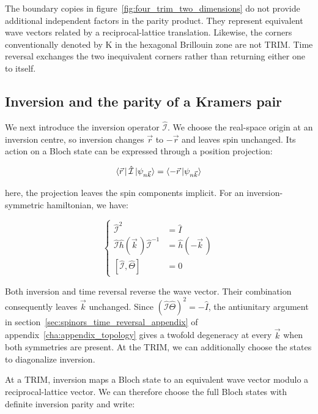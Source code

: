 The boundary copies in figure~\ref{fig:four_trim_two_dimensions} do not provide additional independent factors in the parity product.
They represent equivalent wave vectors related by a reciprocal-lattice translation.
Likewise, the corners conventionally denoted by $\mathrm{K}$ in the hexagonal Brillouin zone are not TRIM.
Time reversal exchanges the two inequivalent corners rather than returning either one to itself.

\FloatBarrier
\subsection{Inversion and the parity of a Kramers pair}

We next introduce the inversion operator $\hat{\mathcal{I}}$.
We choose the real-space origin at an inversion centre,
so inversion changes $\vec{r}$ to $-\vec{r}$ and leaves spin unchanged.
Its action on a Bloch state can be expressed through a position projection:

\begin{equation}
    \bra{\vec{r}\,}\hat{\mathcal{I}}\ket{\psi_{n\vec{k}}}
    =\braket{-\vec{r}\,|\psi_{n\vec{k}}}
\label{inversion_position_projection_topology}
\end{equation}

here, the projection leaves the spin components implicit.
For an inversion-symmetric hamiltonian, we have:

\begin{equation}
\left\{\begin{aligned}
    \hat{\mathcal{I}}^2&=\hat{I} \\
    \hat{\mathcal{I}}\hat{h}(\vec{k}\,)\hat{\mathcal{I}}^{-1}
    &=\hat{h}(-\vec{k}\,) \\
    [\hat{\mathcal{I}},\hat{\Theta}]&=0
\end{aligned}\right.
\label{inversion_symmetry_relations_topology}
\end{equation}

Both inversion and time reversal reverse the wave vector.
Their combination consequently leaves $\vec{k}$ unchanged.
Since $(\hat{\mathcal{I}}\hat{\Theta})^2=-\hat{I}$,
the antiunitary argument in section~\ref{sec:spinors_time_reversal_appendix} of appendix~\ref{cha:appendix_topology}
gives a twofold degeneracy at every $\vec{k}$
when both symmetries are present.
At the TRIM, we can additionally choose the states to diagonalize inversion.

At a TRIM, inversion maps a Bloch state to an equivalent wave vector modulo a reciprocal-lattice vector.
We can therefore choose the full Bloch states with definite inversion parity and write:

